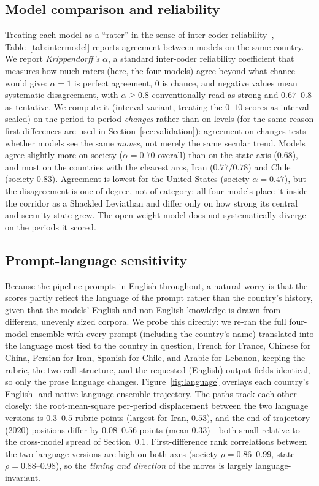 \documentclass[twocolumn,10pt]{article}
\begin{document}
\subsection{Model comparison and reliability}
\label{sec:reliability}
Treating each model as a ``rater'' in the sense of inter-coder
reliability~\citep{krippendorff2018content}, Table~\ref{tab:intermodel} reports
agreement between models on the same country. We report \emph{Krippendorff's}
$\alpha$, a standard inter-coder reliability coefficient that measures how much
raters (here, the four models) agree beyond what chance would give: $\alpha=1$ is
perfect agreement, $0$ is chance, and negative values mean systematic
disagreement, with $\alpha\ge0.8$ conventionally read as strong and
$0.67$--$0.8$ as tentative. We compute it (interval variant, treating the $0$--$10$
scores as interval-scaled) on the period-to-period \emph{changes} rather than on
levels (for the same reason first differences are used in
Section~\ref{sec:validation}): agreement on changes tests whether models see the
same \emph{moves}, not merely the same secular trend. Models agree
slightly more on society ($\alpha=0.70$ overall) than on the state axis
($0.68$), and most on the countries with the clearest arcs, Iran ($0.77/0.78$)
and Chile (society $0.83$).
Agreement is lowest for the United States (society $\alpha=0.47$), but the
disagreement is one of degree, not of category: all four models place it inside
the corridor as a Shackled Leviathan and differ only on how strong its central
and security state grew. The open-weight model does not systematically
diverge on the periods it scored.


\subsection{Prompt-language sensitivity}
\label{sec:language}
Because the pipeline prompts in English throughout, a natural worry is that the
scores partly reflect the language of the prompt rather than the country's
history, given that the models' English and non-English knowledge is drawn from
different, unevenly sized corpora. We probe this directly: we re-ran the full
four-model ensemble with every prompt (including the country's name) translated
into the language most tied to the country in question, French for France,
Chinese for China, Persian for Iran, Spanish for Chile, and Arabic for Lebanon,
keeping the rubric, the two-call structure, and the requested (English) output
fields identical, so only the prose language changes.
Figure~\ref{fig:language} overlays each country's English- and native-language
ensemble trajectory. The paths track each other closely: the root-mean-square
per-period displacement between the two language versions is $0.3$--$0.5$ rubric
points (largest for Iran, $0.53$), and the end-of-trajectory ($2020$) positions
differ by $0.08$--$0.56$ points (mean $0.33$)---both small relative to the
cross-model spread of Section~\ref{sec:reliability}. First-difference rank
correlations between the two language versions are high on both axes
(society $\rho=0.86$--$0.99$, state $\rho=0.88$--$0.98$), so the \emph{timing and
direction} of the moves is largely language-invariant.
\end{document}
